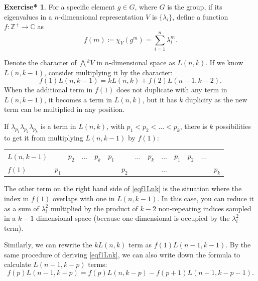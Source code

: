 \documentclass[12pt, letterpaper]{article}
\newcommand{\inte}{\mathbb{Z}}
\newcommand{\co}{\mathbb{C}}
\newcommand{\ext}[1]{\bigwedge\!^{#1}}
\newcommand{\define}{\coloneqq}
\theoremstyle{definition}
\theoremstyle{remark}
\theoremstyle{definition}
\newtheorem{exe*}[exe]{Exercise*}
\theoremstyle{plain}
\numberwithin{equation}{section}
\begin{document}
	\begin{exe*}
		For a specific element $g\in G$, where $G$ is the group,
		if its eigenvalues in a $n$-dimensional representation $V$ is
		$\{\lambda_i\}$,
		define a function $f\colon \inte^+ \to \co$ as
		\[f(m)\define \chi_V(g^m)= \sum_{i=1}^{n}\lambda_i^m.\]
		
		Denote the character of $\ext{k}V$ in $n$-dimensional space
		as $L(n,k)$.
		If we know $L(n,k-1)$, consider multiplying it by the character:
		\begin{equation}\label{eqf1Lnk}
			f(1)L(n,k-1)=k L(n,k)+f(2)L(n-1,k-2).
		\end{equation}
		When the additional term in $f(1)$ does not duplicate with any term in $L(n,k-1)$,
		it becomes a term in $L(n,k)$, but it has $k$ duplicity as the new term can be multiplied
		in any position.
		
		If $\lambda_{p_1}\lambda_{p_2}\lambda_{p_k}$ is a term in $L(n,k)$,
		with $p_1<p_2<\dots<p_k$, there is $k$ possibilities to get it from
		multiplying $L(n,k-1)$ by $f(1)$:
		
		\begin{center}
			\begin{small}
				\setlength{\tabcolsep}{5pt}
				\begin{tabular}{l | c c c c | c c c c | c | c c c c}
					$L(n,k-1)$&     &$p_2$ &$\dots$&$p_{k}$&$p_1$&     &$\dots$&$p_{k}$&$\dots$&$p_1$&$p_2$&$\dots$&\\
					$f(1)$    &$p_1$&      &       &       &     &$p_2$&       &       &$\dots$&     &     &       &$p_k$\\
				\end{tabular}
			\end{small}
		\end{center}
	
		The other term on the right hand side of \eqref{eqf1Lnk} is the situation
		where the index in $f(1)$ overlaps with one in $L(n,k-1)$.
		In this case, you can reduce it as a sum of $\lambda_i^2$ multiplied
		by the product of $k-2$ non-repeating indices sampled in a $k-1$ dimensional space
		(because one dimensional is occupied by the $\lambda_i^2$ term).
		
		Similarly, we can rewrite the $kL(n,k)$ term as $f(1)L(n-1,k-1)$.
		By the same procedure of deriving \eqref{eqf1Lnk},
		we can also write down the formula to calculate $L(n-1,k-p)$ terms:
		\begin{equation}\label{eqfpLn-1}
			f(p)L(n-1,k-p)=f(p)L(n,k-p)-f(p+1)L(n-1,k-p-1).
		\end{equation}
		

\end{exe*}
\end{document}
